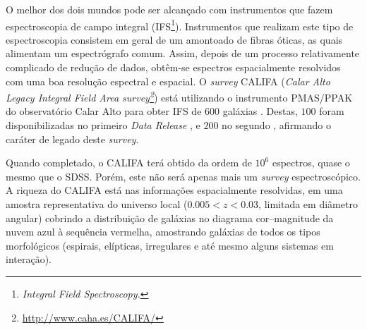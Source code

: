 O melhor dos dois mundos pode ser alcançado com instrumentos que fazem
espectroscopia de campo integral (IFS\footnote{\em Integral Field
Spectroscopy.}). Instrumentos que realizam este tipo de espectroscopia consistem
em geral de um amontoado de fibras óticas, as quais alimentam um espectrógrafo
comum. Assim, depois de um processo relativamente complicado de redução de
dados, obtêm-se espectros espacialmente resolvidos com uma boa resolução
espectral e espacial. O {\em survey} CALIFA ({\em Calar Alto Legacy Integral
Field Area survey\footnote{\url{http://www.caha.es/CALIFA/}}}) está utilizando o
instrumento PMAS/PPAK do observatório Calar Alto para obter IFS de $600$
galáxias \citep{Sanchez2012}. Destas, $100$ foram disponibilizadas no primeiro
{\em Data Release} \citep[DR1]{Husemann2013}, e $200$ no segundo
\citep{GarciaBenito2015}, afirmando o caráter de legado deste {\em survey}.

Quando completado, o CALIFA terá obtido da ordem de $10^6$ espectros, quase o
mesmo que o SDSS. Porém, este não será apenas mais um {\em survey}
espectroscópico. A riqueza do CALIFA está nas informações espacialmente
resolvidas, em uma amostra representativa do universo local ($0.005 < z < 0.03$,
limitada em diâmetro angular) cobrindo a distribuição de galáxias no diagrama
cor--magnitude da nuvem azul à sequência vermelha, amostrando galáxias de todos
os tipos morfológicos (espirais, elípticas, irregulares e até mesmo alguns
sistemas em interação).


